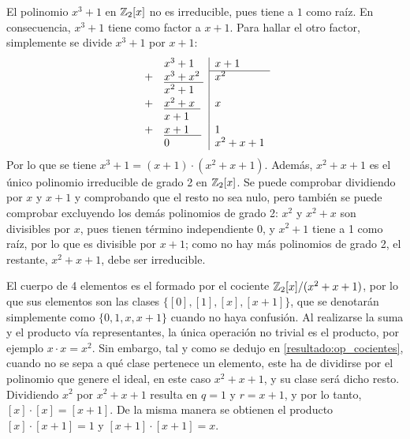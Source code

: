 \begin{Revision}
    \begin{ejs}
    
        \item El polinomio $x^3 + 1$ en $\mathbb{Z}_2[x]$ no es irreducible, pues tiene a $1$ como raíz. En consecuencia, $x^3 + 1$ tiene como factor a $x+1$. Para hallar el otro factor, simplemente se divide $x^3 + 1$ por $x+1$: 
            \[
            \begin{array}{rl|l}
                &x^3 + 1 & x + 1 \\\cline{3-3} 
                + & \underline{x^3 + x^2\phantom{l}} & x^2\\
                 &x^2 + 1 &  \\
                + &\underline{x^2+x\phantom{  1}} &x\\
                 &x + 1 &  \\
                + &\underline{x + 1\phantom{ n 1}} &1\\
                &0& x^2 + x +1 \\
            \end{array}
            \]
        Por lo que se tiene $x^3 + 1 = (x+1)\cdot(x^2+x+1)$. Además, $x^2+x+1$ es el único polinomio irreducible de grado 2 en $\mathbb{Z}_2[x]$. Se puede comprobar dividiendo por $x$ y $x+1$ y comprobando que el resto no sea nulo, pero también se puede comprobar excluyendo los demás polinomios de grado 2: $x^2$ y $x^2 + x$ son divisibles por $x$, pues tienen término independiente 0, y $x^2 + 1$ tiene a 1 como raíz, por lo que es divisible por $x+1$; como no hay más polinomios de grado 2, el restante, $x^2+x+1$, debe ser irreducible.
        
        \item El cuerpo de 4 elementos es el formado por el cociente $\mathbb{Z}_2[x]/(x^2+x+1)$, por lo que sus elementos son las clases $\{[0],[1],[x],[x+1]\}$, que se denotarán simplemente como $\{0,1,x,x+1\}$ cuando no haya confusión. Al realizarse la suma y el producto vía representantes, la única operación no trivial es el producto, por ejemplo $x\cdot x = x^2$. Sin embargo, tal y como se dedujo en \ref{resultado:op_cocientes}, cuando no se sepa a qué clase pertenece un elemento, este ha de dividirse por el polinomio que genere el ideal, en este caso $x^2+x+1$, y su clase será dicho resto. Dividiendo $x^2$ por $x^2+x+1$ resulta en $q = 1$ y $r = x + 1$, y por lo tanto, $[x]\cdot[x] = [x+1]$. De la misma manera se obtienen el producto $[x]\cdot[x+1] = 1$ y $[x+1]\cdot[x+1] = x$.


\end{ejs}
\end{Revision}

